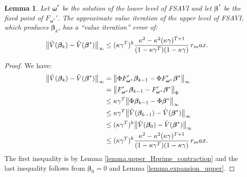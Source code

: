 \documentclass[11pt, notitlepage]{article}
\newcommand{\1}{\mathbbm{1}}
\newtheorem{lemma}{Lemma}[section]
\begin{document}
\begin{lemma}
\label{lemma:value_iteration_avi}
Let $\boldsymbol{\omega}^*$ be the solution of the lower level of FSAVI and let $\boldsymbol{\beta}^*$ be the fixed point of $F_{\boldsymbol{\omega}^*}'$. The approximate value iteration of the upper level of FSAVI, which produces $\boldsymbol{\beta}_k$, has a ``value iteration'' error of:
\[
 \bigl\|\hat{V}(\boldsymbol{\beta}_k) - \hat{V}(\boldsymbol{\beta}^*)  \bigr\|_\infty \le (\kappa \gamma^T)^k \frac{\kappa^2 - \kappa^2 (\kappa\gamma)^{T+1}}{(1-\kappa \gamma^T) (1-\kappa\gamma)} \, r_\textnormal{max}. 
\]
\end{lemma}
\begin{proof}
We have:
\begin{align*}
    \bigl\|\hat{V}(\boldsymbol{\beta}_k) - \hat{V}(\boldsymbol{\beta}^*)  \bigr\|_\infty 
    &= \bigl\|\Phi F_{\boldsymbol{\omega}^*}' \boldsymbol{\beta}_{k-1} - \Phi F_{\boldsymbol{\omega}^*}' \boldsymbol{\beta}^* \bigr\|_\infty\\
    &= \bigl\| F_{\boldsymbol{\omega}^*}' \boldsymbol{\beta}_{k-1} - F_{\boldsymbol{\omega}^*}' \boldsymbol{\beta}^* \bigr\|_\Phi\\
    &\le \kappa \gamma^T \bigl \| \Phi \boldsymbol{\beta}_{k-1} - \Phi \boldsymbol{\beta}^*  \bigr\|_\infty\\
    &\le \kappa \gamma^T \bigl \| \hat{V}(\boldsymbol{\beta}_{k-1}) - \hat{V}(\boldsymbol{\beta}^*)\bigr\|_\infty\\
    &\le (\kappa \gamma^T)^k \bigl \| \hat{V}(\boldsymbol{\beta}_{0}) - \hat{V}(\boldsymbol{\beta}^*)\bigr\|_\infty\\
    &\le (\kappa \gamma^T)^k \frac{\kappa^2 - \kappa^2 (\kappa\gamma)^{T+1}}{(1-\kappa \gamma^T) (1-\kappa\gamma)} \, r_\textnormal{max}.
\end{align*}
The first inequality is by Lemma \ref{lemma.upper_Hprime_contraction} and the last inequality follows from $\boldsymbol{\beta}_0=0$ and Lemma \ref{lemma.expansion_upper}.
\end{proof}
\end{document}
